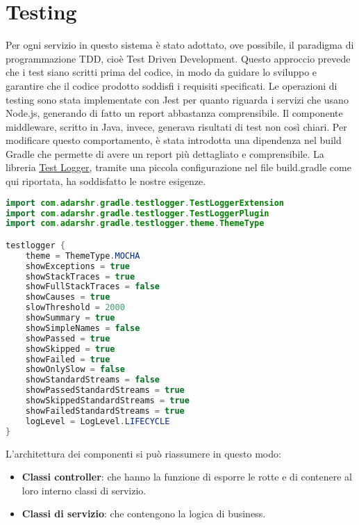 \chapter{Testing}
\label{ch:testing}

Per ogni servizio in questo sistema è stato adottato, ove possibile, il paradigma di programmazione TDD, cioè Test Driven Development. Questo approccio prevede che i test siano scritti prima del codice, in modo da guidare lo sviluppo e garantire che il codice prodotto soddisfi i requisiti specificati.
Le operazioni di testing sono stata implementate con Jest per quanto riguarda i servizi che usano Node.js, generando di fatto un report abbastanza comprensibile. Il componente middleware, scritto in Java, invece, generava risultati di test non così chiari. Per modificare questo comportamento, è stata introdotta una dipendenza nel build Gradle che permette di avere un report più dettagliato e comprensibile. 
La libreria \href{https://plugins.gradle.org/plugin/com.adarshr.test-logger}{\underline{Test Logger}}, tramite una piccola configurazione nel file build.gradle come qui riportata, ha soddisfatto le nostre esigenze.

\begin{lstlisting}[language=Java, caption={Test logger}, label=list:gradle_testlogger]
import com.adarshr.gradle.testlogger.TestLoggerExtension
import com.adarshr.gradle.testlogger.TestLoggerPlugin
import com.adarshr.gradle.testlogger.theme.ThemeType

testlogger {
    theme = ThemeType.MOCHA
    showExceptions = true
    showStackTraces = true
    showFullStackTraces = false
    showCauses = true
    slowThreshold = 2000
    showSummary = true
    showSimpleNames = false
    showPassed = true
    showSkipped = true
    showFailed = true
    showOnlySlow = false
    showStandardStreams = false
    showPassedStandardStreams = true
    showSkippedStandardStreams = true
    showFailedStandardStreams = true
    logLevel = LogLevel.LIFECYCLE
}
\end{lstlisting}
\vspace{1cm}

L'architettura dei componenti si può riassumere in questo modo:
\begin{itemize}
	\item \textbf{Classi controller}: che hanno la funzione di esporre le rotte e di contenere al loro interno classi di servizio.
	\item \textbf{Classi di servizio}: che contengono la logica di business.
\end{itemize}

